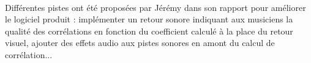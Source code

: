 \paragraph{}
Différentes pistes ont été proposées par Jérémy dans son rapport pour
améliorer le logiciel produit : implémenter un retour sonore indiquant
aux musiciens la qualité des corrélations en fonction du coefficient
calculé à la place du retour visuel, ajouter des effets audio aux
pistes sonores en amont du calcul de corrélation...
